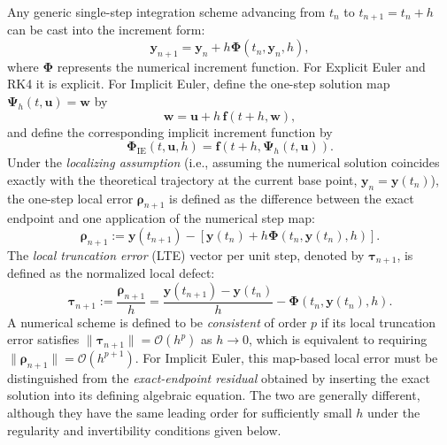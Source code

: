 \documentclass[11pt,a4paper]{article}
\theoremstyle{definition}
\theoremstyle{remark}
\begin{document}
Any generic single-step integration scheme advancing from $t_n$ to $t_{n+1}=t_n+h$ can be cast into the increment form:
\begin{equation}
\label{eq:general_increment_function}
\mathbf{y}_{n+1} = \mathbf{y}_n + h \mathbf{\Phi}(t_n, \mathbf{y}_n, h),
\end{equation}
where $\mathbf{\Phi}$ represents the numerical increment function. For Explicit Euler and RK4 it is explicit. For Implicit Euler, define the one-step solution map $\boldsymbol{\Psi}_h(t,\mathbf{u})=\mathbf{w}$ by
\begin{equation}
\label{eq:implicit_one_step_map}
\mathbf{w}=\mathbf{u}+h\,\mathbf{f}(t+h,\mathbf{w}),
\end{equation}
and define the corresponding implicit increment function by
\begin{equation}
\label{eq:implicit_increment_function}
\mathbf{\Phi}_{\mathrm{IE}}(t,\mathbf{u},h)=\mathbf{f}\left(t+h,\boldsymbol{\Psi}_h(t,\mathbf{u})\right).
\end{equation}
Under the \emph{localizing assumption} (i.e., assuming the numerical solution coincides exactly with the theoretical trajectory at the current base point, $\mathbf{y}_n = \mathbf{y}(t_n)$), the one-step local error $\boldsymbol{\rho}_{n+1}$ is defined as the difference between the exact endpoint and one application of the numerical step map:
\begin{equation}
\label{eq:local_defect_def}
\boldsymbol{\rho}_{n+1} := \mathbf{y}(t_{n+1}) - \left[ \mathbf{y}(t_n) + h \mathbf{\Phi}(t_n, \mathbf{y}(t_n), h) \right].
\end{equation}
The \emph{local truncation error} (LTE) vector per unit step, denoted by $\boldsymbol{\tau}_{n+1}$, is defined as the normalized local defect:
\begin{equation}
\label{eq:lte_def}
\boldsymbol{\tau}_{n+1} := \frac{\boldsymbol{\rho}_{n+1}}{h} = \frac{\mathbf{y}(t_{n+1}) - \mathbf{y}(t_n)}{h} - \mathbf{\Phi}(t_n, \mathbf{y}(t_n), h).
\end{equation}
A numerical scheme is defined to be \emph{consistent} of order $p$ if its local truncation error satisfies $\|\boldsymbol{\tau}_{n+1}\| = \mathcal{O}(h^p)$ as $h \to 0$, which is equivalent to requiring $\|\boldsymbol{\rho}_{n+1}\| = \mathcal{O}(h^{p+1})$.
For Implicit Euler, this map-based local error must be distinguished from the \emph{exact-endpoint residual} obtained by inserting the exact solution into its defining algebraic equation. The two are generally different, although they have the same leading order for sufficiently small $h$ under the regularity and invertibility conditions given below.
\end{document}
